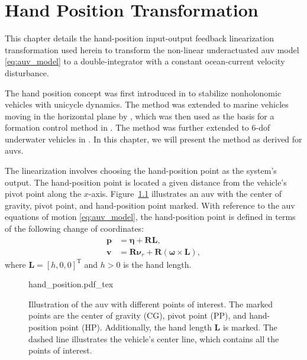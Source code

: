 \chapter{Hand Position Transformation}\label{cha:hand_position}
This chapter details the hand-position input-output feedback linearization transformation used herein to transform the non-linear underactuated \gls{auv} model \eqref{eq:auv_model} to a double-integrator with a constant ocean-current velocity disturbance.

The hand position concept was first introduced in \cite{pomet_hybrid_1992} to stabilize nonholonomic vehicles with unicycle dynamics. The method was extended to marine vehicles moving in the horizontal plane by \cite{paliotta_trajectory_2019}, which was then used as the basis for a formation control method in \cite{restrepo_tracking--formation_2022}. The method was further extended to 6-\gls{dof} underwater vehicles in \cite{matous_trajectory_2023}. In this chapter, we will present the method as derived for \glspl{auv}.

The linearization involves choosing the hand-position point as the system's output. The hand-position point is located a given distance from the vehicle's pivot point along the $x$-axis. Figure~\ref{fig:hand_illustration} illustrates an \gls{auv} with the center of gravity, pivot point, and hand-position point marked. With reference to the \gls{auv} equations of motion \eqref{eq:auv_model}, the hand-position point is defined in terms of the following change of coordinates:
\begin{subequations}\label{eq:hand_position}
    \begin{align}
        \mathbf{p} &= \bm{\eta} + \mathbf{RL},\\
        \mathbf{v} &= \mathbf{R} \bm{\nu}_r + \mathbf{R}(\bm{\omega}\times \mathbf{L}),
    \end{align}
\end{subequations}
where $\mathbf{L} = [h,0,0]^\mathrm{T}$ and $h>0$ is the hand length.\enlargethispage*{\baselineskip}
\begin{figure}[ht]
    \centering
    \def\svgwidth{.5\textwidth}
    {hand_position.pdf_tex}
    \caption{Illustration of the \gls{auv} with different points of interest. The marked points are the center of gravity (CG), pivot point (PP), and hand-position point (HP). Additionally, the hand length $\mathbf{L}$ is marked. The dashed line illustrates the vehicle's center line, which contains all the points of interest.}
    \label{fig:hand_illustration}
\end{figure}

